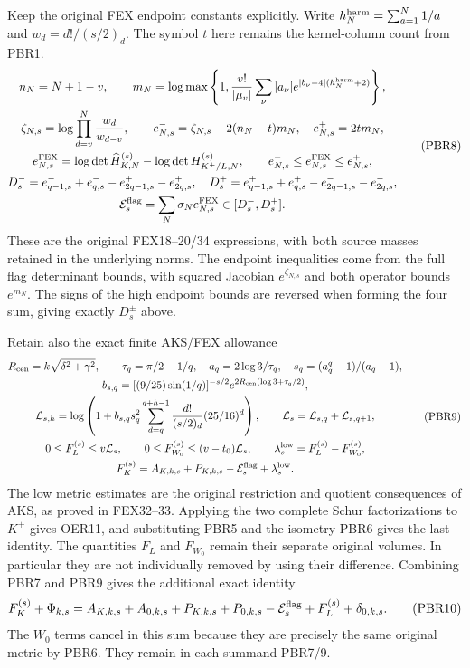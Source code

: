 \documentclass[11pt,a4paper]{article}
\begin{document}
Keep the original FEX endpoint constants explicitly. Write
$h_N^{\rm harm}=\sum_{a=1}^N1/a$ and $w_d=d!/(s/2)_d$.
The symbol $t$ here remains the kernel-column count from PBR1.
\[
\begin{gathered}
 n_N=N+1-v,\qquad
 m_N=\log\max\left\{1,\frac{v!}{|\mu_v|}
       \sum_\nu|a_\nu|e^{|b_\nu-4|(h_N^{\rm harm}+2)}\right\},\\
 \zeta_{N,s}=\log\prod_{d=v}^N\frac{w_d}{w_{d-v}},\qquad
 e_{N,s}^-=\zeta_{N,s}-2(n_N-t)m_N,\quad e_{N,s}^+=2tm_N,\\
 e_{N,s}^{\rm FEX}
   =\log\det\widehat H_{K,N}^{(s)}
          -\log\det H_{K^+/L,N}^{(s)},\qquad
 e_{N,s}^-\le e_{N,s}^{\rm FEX}\le e_{N,s}^+,\\
 D_s^-=e_{q-1,s}^-+e_{q,s}^--e_{2q-1,s}^+-e_{2q,s}^+,\quad
 D_s^+=e_{q-1,s}^++e_{q,s}^+-e_{2q-1,s}^--e_{2q,s}^-,\\
 \mathcal E_s^{\rm flag}=\sum_N\sigma_N e_{N,s}^{\rm FEX}
       \in[D_s^-,D_s^+].
\end{gathered}\tag{PBR8}
\]
These are the original FEX18--20/34 expressions, with both source
masses retained in the underlying norms. The endpoint inequalities
come from the full flag determinant bounds, with squared Jacobian
$e^{\zeta_{N,s}}$ and both operator bounds $e^{m_N}$.
The signs of the high endpoint bounds are reversed when forming
the four sum, giving exactly $D_s^\pm$ above.

Retain also the exact finite AKS/FEX allowance
\[
\begin{gathered}
 R_{\rm cen}=k\sqrt{\delta^2+\gamma^2},\qquad
 \tau_q=\pi/2-1/q,\quad a_q=2\log3/\tau_q,\quad
 s_q=(a_q^q-1)/(a_q-1),\\
 b_{s,q}=[(9/25)\sin(1/q)]^{-s/2}
                      e^{2R_{\rm cen}(\log3+\tau_q/2)},\\
 \mathcal L_{s,h}=\log\left(1+b_{s,q}s_q^2
          \sum_{d=q}^{q+h-1}\frac{d!}{(s/2)_d}(25/16)^d\right),
 \qquad \mathcal L_s=\mathcal L_{s,q}+\mathcal L_{s,q+1},\\
 0\le F_L^{(s)}\le v\mathcal L_s,\qquad
 0\le F_{W_0}^{(s)}\le(v-t_0)\mathcal L_s,\qquad
 \lambda_s^{\rm low}=F_L^{(s)}-F_{W_0}^{(s)},\\
 F_K^{(s)}
 =A_{K,k,s}+P_{K,k,s}-\mathcal E_s^{\rm flag}
                                      +\lambda_s^{\rm low}.
\end{gathered}\tag{PBR9}
\]
The low metric estimates are the original restriction and quotient
consequences of AKS, as proved in FEX32--33. Applying the two complete
Schur factorizations to $K^+$ gives OER11, and substituting PBR5
and the isometry PBR6 gives the last identity. The quantities
$F_L$ and $F_{W_0}$ remain their separate original volumes.
In particular they are not individually removed by using their
difference. Combining PBR7 and PBR9 gives the additional exact
identity
\[
 F_K^{(s)}+\Phi_{k,s}
 =A_{K,k,s}+A_{0,k,s}+P_{K,k,s}+P_{0,k,s}
       -\mathcal E_s^{\rm flag}+F_L^{(s)}+\delta_{0,k,s}.
 \tag{PBR10}
\]
The $W_0$ terms cancel in this sum because they are precisely the
same original metric by PBR6. They remain in each summand PBR7/9.
\end{document}
